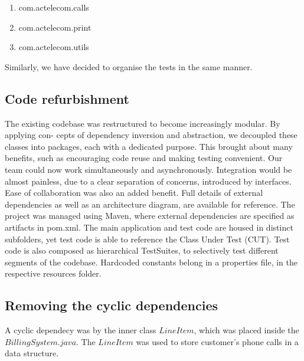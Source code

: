 \documentclass[11pt,twocolumn]{article} %
\begin{document}
\begin{enumerate}
 \item{com.actelecom.calls}
 \item{com.actelecom.print}
 \item{com.actelecom.utils}
\end{enumerate}

Similarly, we have decided to organise the tests in the same manner.




\iffalse
\subsection{Handling the cyclic dependencies}
This was caused by an inner LineItem class within BillingSystem. This was required by
BillGenerator, as it was populating a data structure containing all phone calls made by
customers.
To solve this, LineItem was extracted out into the com.acmetelecom.util subpackage,
thus removing this cyclic dependency, and at the same time, evolving the overall system
towards a more reasonable structure.
\fi

\subsection{Code refurbishment}
The existing codebase was restructured to become increasingly modular. By applying con-
cepts of dependency inversion and abstraction, we decoupled these classes into packages,
each with a dedicated purpose.
This brought about many benefits, such as encouraging code reuse and making testing
convenient. Our team could now work simultaneously and asynchronously. Integration
would be almost painless, due to a clear separation of concerns, introduced by interfaces.
Ease of collaboration was also an added benefit.
Full details of external dependencies as well as an architecture diagram, are available for reference.
The project was managed using Maven, where external dependencies are specified as
artifacts in pom.xml. The main application and test code are housed in distinct subfolders,
yet test code is able to reference the Class Under Test (CUT). Test code is also composed
as hierarchical TestSuites, to selectively test different segments of the codebase. Hardcoded
constants belong in a properties file, in the respective resources folder.

\subsection{Removing the cyclic dependencies}
A cyclic dependecy was by the inner class $LineItem$, which was placed inside the $BillingSystem.java$.
The $LineItem$ was used to store customer's phone calls in a data structure.
\end{document}
